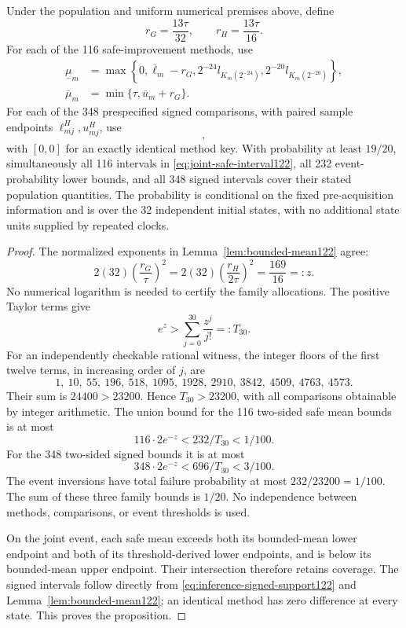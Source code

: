 \begin{proposition}
\label{prop:joint-inference122}
Under the population and uniform numerical premises above, define
\[
 r_G=\frac{13\tau}{32},\qquad r_H=\frac{13\tau}{16}.
\]
For each of the 116 safe-improvement methods, use
\begin{align}
 \underline\mu_m
 &=\max\left\{0,\overline\ell_m-r_G,
                2^{-24}l_{K_m(2^{-24})},
                2^{-20}l_{K_m(2^{-20})}\right\},\\
 \overline\mu_m&=\min\{\tau,\overline u_m+r_G\}.
 \label{eq:joint-safe-interval122}
\end{align}
For each of the 348 prespecified signed comparisons, with paired sample
endpoints \(\ell^H_{mj},u^H_{mj}\), use
\begin{equation}
 [\,\max\{-\tau,\overline\ell^H_m-r_H\},
       \min\{\tau,\overline u^H_m+r_H\}\,],
 \label{eq:joint-signed-interval122}
\end{equation}
with \([0,0]\) for an exactly identical method key. With probability
at least \(19/20\), simultaneously all 116 intervals in
\eqref{eq:joint-safe-interval122}, all 232 event-probability lower
bounds, and all 348 signed intervals cover their stated population
quantities. The probability is conditional on the fixed
pre-acquisition information and is over the 32 independent initial
states, with no additional state units supplied by repeated clocks.
\end{proposition}

\begin{proof}
The normalized exponents in Lemma~\ref{lem:bounded-mean122} agree:
\[
 2(32)\left(\frac{r_G}{\tau}\right)^2
 =2(32)\left(\frac{r_H}{2\tau}\right)^2
 =\frac{169}{16}=:z.
\]
No numerical logarithm is needed to certify the family allocations.
The positive Taylor terms give
\[
 e^z>\sum_{j=0}^{30}\frac{z^j}{j!}=:T_{30}.
\]
For an independently checkable rational witness, the integer floors of
the first twelve terms, in increasing order of \(j\), are
\[
 1,\ 10,\ 55,\ 196,\ 518,\ 1095,\ 1928,\ 2910,\
 3842,\ 4509,\ 4763,\ 4573.
\]
Their sum is \(24400>23200\). Hence \(T_{30}>23200\), with all
comparisons obtainable by integer arithmetic. The union bound for the
116 two-sided safe mean bounds is at most
\[
 116\cdot2e^{-z}<232/T_{30}<1/100.
\]
For the 348 two-sided signed bounds it is at most
\[
 348\cdot2e^{-z}<696/T_{30}<3/100.
\]
The event inversions have total failure probability at most
\(232/23200=1/100\). The sum of these three family bounds is
\(1/20\). No independence between methods, comparisons, or event
thresholds is used.

On the joint event, each safe mean exceeds both its bounded-mean lower
endpoint and both of its threshold-derived lower endpoints, and is
below its bounded-mean upper endpoint. Their intersection therefore
retains coverage. The signed intervals follow directly from
\eqref{eq:inference-signed-support122} and
Lemma~\ref{lem:bounded-mean122}; an identical method has zero difference
at every state. This proves the proposition.
\end{proof}

